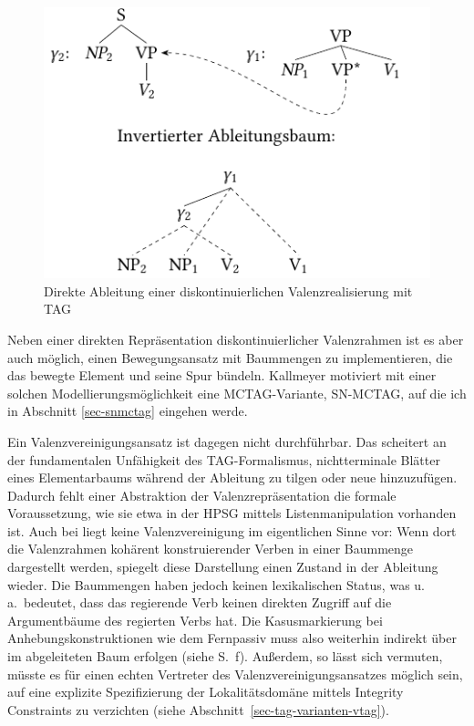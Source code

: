 \begin{figure}
\centering
\includegraphics[angle=90]{graphics/abb65.pdf}
\caption{\label{fig-kohaerenz-strategien-3}Direkte Ableitung einer diskontinuierlichen Valenzrealisierung mit TAG}
\end{figure}

Neben einer direkten Repräsentation diskontinuierlicher Valenzrahmen ist es aber auch möglich, einen Bewegungsansatz mit Baummengen zu implementieren, die das bewegte Element und seine Spur bündeln. Kallmeyer motiviert mit einer solchen Modellierungsmöglichkeit eine MCTAG-Variante, SN-MCTAG, auf die ich in Abschnitt \ref{sec-snmctag} eingehen werde. 

Ein Valenzvereinigungsansatz ist dagegen nicht durchführbar. Das scheitert an der fundamentalen Unfähigkeit des TAG-Formalismus, nichtterminale Blätter eines Elementarbaums während der Ableitung zu tilgen oder neue hinzuzufügen. Dadurch fehlt einer Abstraktion der Valenzrepräsentation die formale Voraussetzung, wie sie etwa in der HPSG mittels Listenmanipulation vorhanden ist. Auch bei \citet[171]{Rambow:94} liegt keine Valenzvereinigung im eigentlichen Sinne vor: Wenn dort die Valenzrahmen kohärent konstruierender Verben in einer Baummenge dargestellt werden, spiegelt diese Darstellung  einen Zustand in der Ableitung wieder. Die Baummengen haben jedoch keinen lexikalischen Status, was u.\,a.\ bedeutet, dass das regierende Verb keinen direkten Zugriff auf die Argumentbäume des regierten Verbs hat. Die Kasusmarkierung bei Anhebungskonstruktionen wie dem Fernpassiv muss also weiterhin indirekt über  im abgeleiteten Baum erfolgen (siehe S.~\pageref{sec-ttmctag-fern}f). Au\ss erdem, so lässt sich vermuten, müsste es für einen echten Vertreter des Valenzvereinigungsansatzes möglich sein, auf eine explizite Spezifizierung der Lokalitätsdomäne mittels Integrity Constraints zu verzichten (siehe Abschnitt~\ref{sec-tag-varianten-vtag}).




